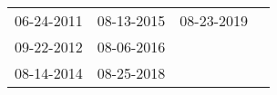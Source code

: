 \begin{supertabular}{llll}
 06-24-2011 &  08-13-2015 &  08-23-2019 \\
 09-22-2012 &  08-06-2016 &             \\
 08-14-2014 &  08-25-2018 &             \\
\end{supertabular}
